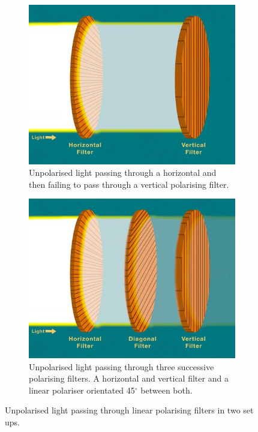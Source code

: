 \begin{figure}[H]
  \centering
  \begin{subfigure}[t]{0.4\textwidth}
    \centering
    \includegraphics[width=\textwidth]{images/2 polariser.jpg}
    \caption{Unpolarised light passing through a horizontal and then failing to pass through a vertical polarising filter.}\label{fig:2 polarise}
  \end{subfigure}
  \begin{subfigure}[t]{0.4\textwidth}
    \centering
    \includegraphics[width=\textwidth]{images/3 polariser.jpg}
    \caption{Unpolarised light passing through three successive polarising filters. A horizontal and vertical filter and a linear polariser orientated 45$^\circ$ between both. }\label{fig:3 polarise}
  \end{subfigure}
  \caption{Unpolarised light passing through linear polarising filters in two set ups. \cite{noauthor_whatCal_nodate}}
  \label{fig:polarisers}
\end{figure}

